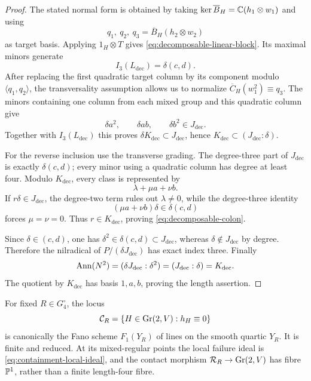 \begin{proof}
The stated normal form is obtained by taking
\(\ker\overline B_H=\mathbb C(h_1\otimes w_1)\) and using
\[
 q_1,\ q_2,\ q_3=\overline B_H(h_2\otimes w_2)
\]
as target basis.  Applying \(1_H\otimes T\) gives
\eqref{eq:decomposable-linear-block}.  Its maximal minors generate
\[
 I_3(L_{\mathrm{dec}})=\delta(c,d).
\]
After replacing the first quadratic target column by its component
modulo \(\langle q_1,q_2\rangle\), the transversality assumption
allows us to normalize
\(\overline C_H(w_1^2)\equiv q_3\).  The minors containing one
column from each mixed group and this quadratic column give
\[
 \delta a^2,\qquad \delta ab,\qquad \delta b^2
 \in J_{\mathrm{dec}}.
\]
Together with \(I_3(L_{\mathrm{dec}})\) this proves
\(\delta K_{\mathrm{dec}}\subset J_{\mathrm{dec}}\), hence
\(K_{\mathrm{dec}}\subset(J_{\mathrm{dec}}:\delta)\).

For the reverse inclusion use the transverse grading.
The degree-three part of \(J_{\mathrm{dec}}\) is exactly
\(\delta(c,d)\); every minor using a quadratic column has degree at
least four.  Modulo \(K_{\mathrm{dec}}\), every class is represented
by
\[
 \lambda+\mu a+\nu b.
\]
If \(r\delta\in J_{\mathrm{dec}}\), the degree-two term rules out
\(\lambda\ne0\), while the degree-three identity
\[
 (\mu a+\nu b)\delta\in\delta(c,d)
\]
forces \(\mu=\nu=0\).  Thus \(r\in K_{\mathrm{dec}}\), proving
\eqref{eq:decomposable-colon}.

Since \(\delta\in(c,d)\), one has
\(\delta^2\in\delta(c,d)\subset J_{\mathrm{dec}}\), whereas
\(\delta\notin J_{\mathrm{dec}}\) by degree.  Therefore the
nilradical of \(P/(\delta J_{\mathrm{dec}})\) has exact index three.
Finally
\[
 \operatorname{Ann}(N^2)
 =(\delta J_{\mathrm{dec}}:\delta^2)
 =(J_{\mathrm{dec}}:\delta)
 =K_{\mathrm{dec}}.
\]
The quotient by \(K_{\mathrm{dec}}\) has basis \(1,a,b\), proving the
length assertion.
\end{proof}

\begin{proposition}
\label{prop:containment-lines}
For fixed \(R\in G_4^\circ\), the locus
\[
 \mathcal C_R=\{H\in\operatorname{Gr}(2,V):h_H\equiv0\}
\]
is canonically the Fano scheme \(F_1(Y_R)\) of lines on the smooth
quartic \(Y_R\).  It is finite and reduced.  At its mixed-regular
points the local failure ideal is
\eqref{eq:containment-local-ideal}, and the contact morphism
\(\mathcal R_R\to\operatorname{Gr}(2,V)\) has fibre \(\mathbb P^1\), rather than a finite
length-four fibre.
\end{proposition}

